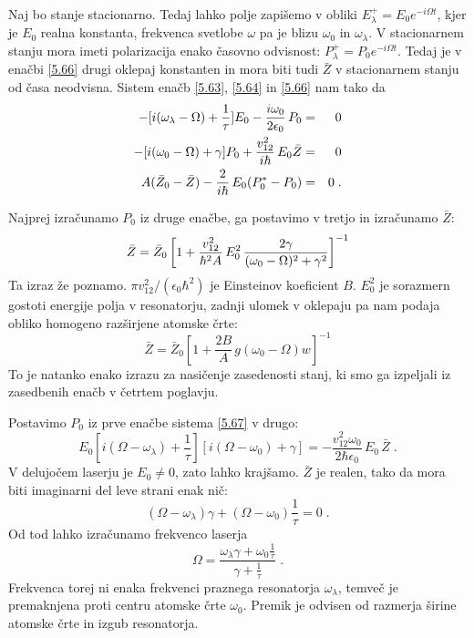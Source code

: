 Naj bo stanje stacionarno. Tedaj lahko polje zapišemo v obliki $E_{\lambda
}^{+}=E_{0}e^{-i\Omega t}$, kjer je $E_{0}$ realna konstanta, frekvenca
svetlobe $\omega $ pa je blizu $\omega _{0}$ in $\omega _{\lambda }$. V
stacionarnem stanju mora imeti polarizacija enako časovno odvisnost: $%
P_{\lambda }^{+}=P_{0}e^{-i\Omega t}$. Tedaj je v enačbi \ref{5.66} drugi
oklepaj konstanten in mora biti tudi $\bar{Z}$ v stacionarnem stanju od
časa neodvisna. Sistem enačb \ref{5.63}, \ref{5.64} in \ref{5.66} nam
tako da 
\begin{eqnarray}
-[i(\omega _{\lambda }-\Omega )+\frac{1}{\tau }]E_{0}-\frac{i\omega _{0}}{%
2\epsilon _{0}}\,P_{0} &=&0  \nonumber  \label{5.67} \\
-[i(\omega _{0}-\Omega )+\gamma ]P_{0}+\frac{v_{12}^{2}}{i\hbar }\,E_{0}\bar{%
Z} &=&0  \nonumber \\
A(\bar{Z}_{0}-\bar{Z})-\frac{2}{i\hbar }\,E_{0}(P_{0}^{*}-P_{0}) &=&0\;.
\end{eqnarray}

Najprej izračunamo $P_0$ iz druge enačbe, ga postavimo v tretjo in
izračunamo $\bar{Z}$: 
\begin{equation}  \label{5.68}
\bar{Z}=\bar{Z}_0\left[1+\frac{v_{12}^2}{\hbar^2 A}\,E_0^2\, \frac{2\gamma}{%
(\omega_0-\Omega)^2+\gamma^2}\right]^{-1}
\end{equation}
Ta izraz že poznamo. $\pi v_{12}^2/(\epsilon_0\hbar^2)$ je Einsteinov
koeficient $B$. $E_0^2$ je sorazmern gostoti energije polja v resonatorju,
zadnji ulomek v oklepaju pa nam podaja obliko homogeno razširjene atomske
črte: 
\begin{equation}  \label{5.69}
\bar{Z}=\bar{Z}_0\left[1+\frac{2B}{A}\,g(\omega_0- \Omega)w\right]^{-1}
\end{equation}
To je natanko enako izrazu za nasičenje zasedenosti stanj, ki smo ga
izpeljali iz zasedbenih enačb v četrtem poglavju.

Postavimo $P_0$ iz prve enačbe sistema \ref{5.67} v drugo: 
\begin{equation}  \label{5.70}
E_0[i(\Omega-\omega_{\lambda})+\frac{1}{\tau}] [i(\Omega- \omega_0)
+\gamma]=-\frac{v_{12}^2 \omega_0}{2\hbar\epsilon_0}\,E_0\,\bar{Z}\;.
\end{equation}
V delujočem laserju je $E_0\ne 0$, zato lahko krajšamo. $\bar{Z}$ je
realen, tako da mora biti imaginarni del leve strani enak nič: 
\begin{equation}  \label{5.71}
(\Omega- \omega_{\lambda})\gamma+(\Omega- \omega_0)\frac{1}{\tau} = 0 \;.
\end{equation}
Od tod lahko izračunamo frekvenco laserja 
\begin{equation}  \label{5.72}
\Omega=\frac{\omega_{\lambda}\gamma+ \omega_0\frac{1}{\tau}}{\gamma + \frac{1%
}{\tau}}\;.
\end{equation}
Frekvenca torej ni enaka frekvenci praznega resonatorja $\omega_{\lambda}$,
temveč je premaknjena proti centru atomske črte $\omega_0$. Premik je
odvisen od razmerja širine atomske črte in izgub resonatorja.

